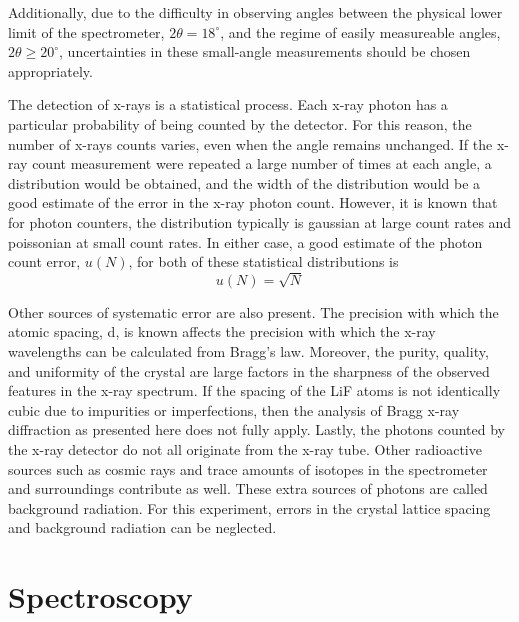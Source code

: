 \documentclass[12pt, a4paper, oneside, openright, titlepage]{book}
\begin{document}
\noindent Additionally, due to the difficulty in observing angles between the physical lower limit of the spectrometer, $2\theta=18^{\circ}$, and the regime of easily measureable angles, $2\theta \geq 20^{\circ}$, uncertainties in these small-angle measurements should be chosen appropriately.


\noindent The detection of x-rays is a statistical process.  Each x-ray photon has a particular probability of being counted by the detector. For this reason, the number of x-rays counts varies, even when the angle remains unchanged. If the x-ray count measurement were repeated a large number of times at each angle, a distribution would be obtained, and the width of the distribution would be a good estimate of the error in the x-ray photon count. However, it is known that for photon counters, the distribution typically is gaussian at large count rates and poissonian at small count rates. In either case, a good estimate of the photon count error, $u(N)$, for both of these statistical distributions is \begin{equation}\label{eq:XR8}
    u(N) = \sqrt{N}
\end{equation}

\noindent Other sources of systematic error are also present. The precision with which the atomic spacing, d, is known affects the precision with which the x-ray wavelengths can be calculated from Bragg’s law. Moreover, the purity, quality, and uniformity of the crystal are large factors in the sharpness of the observed features in the x-ray spectrum. If the spacing of the LiF atoms is not identically cubic due to impurities or imperfections, then the analysis of Bragg x-ray diffraction as presented here does not fully apply. Lastly, the photons counted by the x-ray detector do not all originate from the x-ray tube. Other radioactive sources such as cosmic rays and trace amounts of isotopes in the spectrometer and surroundings contribute as well. These extra sources of photons are called background radiation. For this experiment, errors in the crystal lattice spacing and background radiation can be neglected.


\chapter{Spectroscopy}
\end{document}
